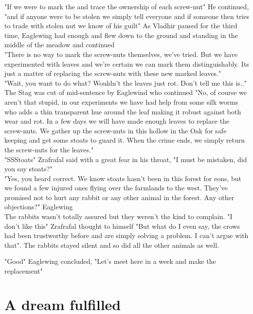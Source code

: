 \documentclass[smalldemyvopaper,11pt,twoside,onecolumn,openright,extrafontsizes]{memoir}
\begin{document}
"If we were to mark the and trace the ownership of each screw-nut" He continued, "and if anyone were to be stolen we simply tell everyone and if someone then tries to trade with stolen nut we know of his guilt" As Vladhir paused for the third time, Eaglewing had enough and flew down to the ground and standing in the middle of the meadow and continued \\

"There is no way to mark the screw-nuts themselves, we've tried. But we have experimented with leaves and we're certain we can mark them distinguishably. Its just a matter of replacing the screw-nuts with these new marked leaves."\\

"Wait, you want to do what? Wouldn't the leaves just rot. Don't tell me this is.." The Stag was cut of mid-sentence by Eaglewind who continued
"No, of course we aren't that stupid, in our experiments we have had help from some silk worms who adds a thin transparent hue around the leaf making it robust against both wear and rot. In a few days we will have made enough leaves to replace the screw-nuts. We gather up the screw-nuts in this hollow in the Oak for safe keeping and get some stoats to guard it. When the crime ends, we simply return the screw-nuts for the leaves."\\

"SSStoats" Zrafrafal said with a great fear in his throat, "I must be mistaken, did you say stoats?"\\

"Yes, you heard correct. We know stoats hasn't been in this forest for eons, but we found a few injured ones flying over the farmlands to the west. They've promised not to hurt any rabbit or any other animal in the forest. Any other objections?" Eaglewing  \\

The rabbits wasn't totally assured but they weren't the kind to complain. "I don't like this" Zrafrafal thought to himself "But what do I even say, the crows had been trustworthy before and are simply solving a problem. I can't argue with that". The rabbits stayed silent and so did all the other animals as well.

"Good" Eaglewing concluded, "Let's meet here in a week and make the replacement"


\chapter{A dream fulfilled}
\end{document}
